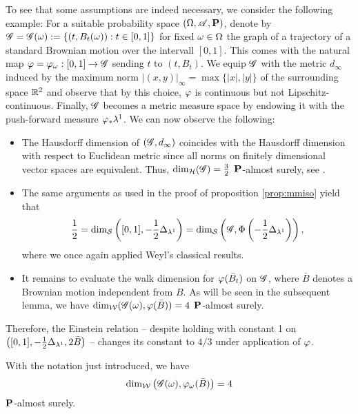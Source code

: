 To see that some assumptions are indeed necessary, we consider the following example: For a suitable probability space $(\Omega,\mathscr{A},\mathbf{P})$, denote by $\mathscr{G}=\mathscr{G}(\omega):=\left\{(t,B_t(\omega)):t\in[0,1] \right\}$ for fixed $\omega\in\Omega$ the graph of a trajectory of a standard Brownian motion over the intervall $[0,1]$. This comes with the natural map $\varphi=\varphi_\omega:[0,1]\to\mathscr{G}$ sending $t$ to $(t,B_t)$. We equip $\mathscr{G}$ with the metric $d_\infty$ induced by the maximum norm
$|(x,y)|_\infty=\max\{|x|,|y|\}$ of the surrounding space $\mathbb{R}^2$ and observe that by this choice, $\varphi$ is continuous but not Lipschitz-continuous. Finally, $\mathscr{G}$ becomes a metric measure space by endowing it with the push-forward measure $\varphi_*\lambda^1$. We can now observe the following:
\begin{itemize}
  \item The Hausdorff dimension of $(\mathscr{G},d_\infty)$ coincides with the Hausdorff dimension with respect to Euclidean  metric since all norms on finitely dimensional vector spaces are equivalent. Thus, $\dim_{\mathcal{H}}(\mathscr{G})=\frac{3}{2}$ $\mathbf{P}$-almost surely, see \cite[Theorem 16.7]{falconer2007fractal}. 
  \item The same arguments as used in the proof of proposition \ref{prop:mmiso} yield that 
  \[
    \frac{1}{2}=\dim_{\mathcal{S}}\left([0,1],-\frac{1}{2}\Delta_{\lambda^1}\right)
    =\dim_{\mathcal{S}}\left(\mathscr{G},\Phi \left(-\frac{1}{2}\Delta_{\lambda^1}\right)\right),
  \]
  where we once again applied Weyl's classical results. 
  \item It remains to evaluate the walk dimension for $\varphi(\bar B_t)$ on $\mathscr{G}$, where $\bar B$ denotes a Brownian motion independent from $B$. As will be seen in the subsequent lemma, we have $\dim_{\mathcal{W}}(\mathscr{G}(\omega),\varphi(\bar B))=4$ $\mathbf{P}$-almost surely.
\end{itemize}
Therefore, the Einstein relation -- despite holding with constant 1 on 
$\left([0,1],-\frac{1}{2}\Delta_{\lambda^1},2\bar B\right)$ -- changes its constant to $4/3$ under application of $\varphi$. 
\begin{lem}
  With the notation just introduced, we have 
  \begin{equation}\label{eq:BMdimw}
    \dim_{\mathcal{W}}\big(\mathscr{G}(\omega),\varphi_\omega(\bar B)\big)=4
  \end{equation}
  $\mathbf{P}$-almost surely.
\end{lem}
